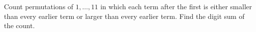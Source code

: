 Count permutations of $1,\ldots,11$ in which each term after the first is either smaller than every earlier term or larger than every earlier term. Find the digit sum of the count.
